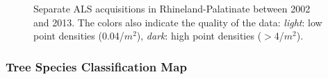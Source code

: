 \begin{figure}[H]
	\centering
	\caption{Separate ALS acquisitions in Rhineland-Palatinate between 2002 and 2013. The colors also indicate the quality of the data: \textit{light}: low point densities (0.04/$m^2$), \textit{dark}: high point densities ($>$4/$m^2$). }
	\label{abb:lidaryears}
\end{figure}



\subsubsection{Tree Species Classification Map}
\label{sec:regmod:tspecclass}

